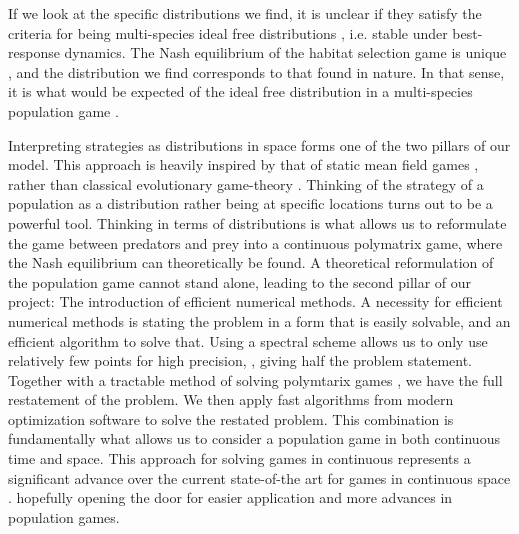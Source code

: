 If we look at the specific distributions we find, it is unclear if they satisfy the criteria for being multi-species ideal free distributions \citep{kvrivan2008ideal}, i.e. stable under best-response dynamics. The Nash equilibrium of the habitat selection game is unique \citep{verticalmigration}, and the distribution we find corresponds to that found in nature. In that sense, it is what would be expected of the ideal free distribution in a multi-species population game \citep{cressman2004ideal}.


Interpreting strategies as distributions in space forms one of the two pillars of our model. This approach is heavily inspired by that of static mean field games \citep{lasry2007mean, blanchet2016optimal}, rather than classical evolutionary game-theory \cite{hofbauer1998evolutionary}. Thinking of the strategy of a population as a distribution rather being at specific locations turns out to be a powerful tool. Thinking in terms of distributions is what allows us to reformulate the game between predators and prey into a continuous polymatrix game, where the Nash equilibrium can theoretically be found. A theoretical reformulation of the population game cannot stand alone, leading to the second pillar of our project: The introduction of efficient numerical methods. A necessity for efficient numerical methods is stating the problem in a form that is easily solvable, and an efficient algorithm to solve that. Using a spectral scheme allows us to only use relatively few points for high precision, \citep{kopriva2009implementing}, giving half the problem statement. Together with a tractable method of solving polymtarix games \citep{miller1991copositive}, we have the full restatement of the problem. We then apply fast algorithms from modern optimization software \citep{Andersson2019, acary2019introduction} to solve the restated problem. This combination is fundamentally what allows us to consider a population game in both continuous time and space. This approach for solving games in continuous represents a significant advance over the current state-of-the art for games in continuous space \citep{mariani2016migration, pinti2021co}. hopefully opening the door for easier application and more advances in population games. 

